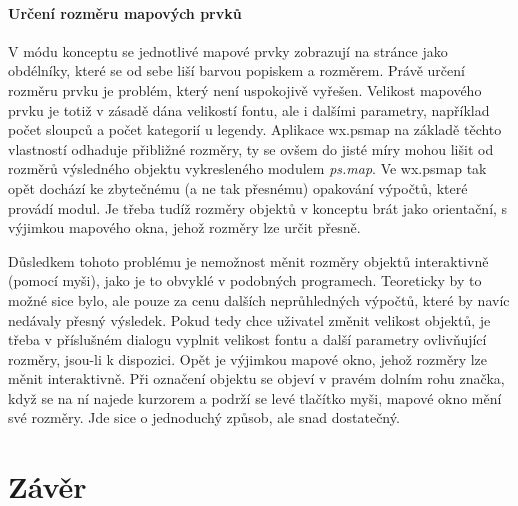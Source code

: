 \documentclass[a4paper,12pt,draft]{article}
\newcommand{\modul}[1]{\emph{#1}}
\begin{document}
 \paragraph*{Určení rozměru mapových prvků}
 V módu konceptu se jednotlivé mapové prvky zobrazují na stránce jako obdélníky, které se od sebe liší barvou popiskem a rozměrem. Právě určení rozměru prvku je problém, který není uspokojivě vyřešen. Velikost mapového prvku je totiž v zásadě dána velikostí fontu, ale i dalšími parametry, například počet sloupců a počet kategorií u legendy. Aplikace wx.psmap na základě těchto vlastností odhaduje přibližné rozměry, ty se ovšem do jisté míry mohou lišit od rozměrů výsledného objektu vykresleného modulem \modul{ps.map}. Ve wx.psmap tak opět dochází ke zbytečnému (a ne tak přesnému) opakování výpočtů, které provádí modul. Je třeba tudíž rozměry objektů v konceptu brát jako orientační, s výjimkou mapového okna, jehož rozměry lze určit přesně.
 
 Důsledkem tohoto problému je nemožnost měnit rozměry objektů interaktivně (pomocí myši), jako je to obvyklé v podobných programech. Teoreticky by to možné sice bylo, ale pouze za cenu dalších neprůhledných výpočtů, které by navíc nedávaly přesný výsledek. Pokud tedy chce uživatel změnit velikost objektů, je třeba v příslušném dialogu vyplnit velikost fontu a další parametry ovlivňující rozměry, jsou-li k dispozici. Opět je výjimkou mapové okno, jehož rozměry lze měnit interaktivně. Při označení objektu se objeví v pravém dolním rohu značka, když se na ní najede kurzorem a podrží se levé tlačítko myši, mapové okno mění své rozměry. Jde sice o jednoduchý způsob, ale snad dostatečný.
 


\section{Závěr}
\end{document}
